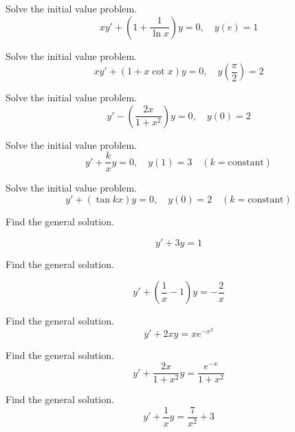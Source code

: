 \documentclass{ximera}
\begin{document}
\begin{problem}\label{exer:2.1.7} Solve
the initial value problem.
$$xy'+\left(1+\frac{1}{\ln x}\right)y=0,\quad y(e)=1$$
\end{problem}

\begin{problem}\label{exer:2.1.8} Solve
the initial value problem.
$$xy'+(1+ x\cot x)y=0,\quad y\left(\frac{\pi}{2}
\right)=2$$
\end{problem}

\begin{problem}\label{exer:2.1.9} Solve
the initial value problem.
$$y'-\left(\frac{2x}{1+x^2}\right)y=0,\quad y(0)=2$$
\end{problem}

\begin{problem}\label{exer:2.1.10} Solve
the initial value problem.
$$y'+\frac{k}{x}y=0,\quad y(1)=3 \quad (k=
\mbox{constant})$$
\end{problem}

\begin{problem}\label{exer:2.1.11} Solve
the initial value problem.
$$y'+(\tan kx)y=0,\quad y(0)=2 \quad (k= \mbox{constant})$$
\end{problem}


\begin{problem}\label{exer:2.1.12} Find
the general solution. 

$$y'+3y=1$$


\end{problem}

\begin{problem}\label{exer:2.1.13} Find
the general solution. 

$$y'+\left(\frac{1}{x}-1\right)y=-\frac{2}{x}$$

\end{problem}

\begin{problem}\label{exer:2.1.14} Find
the general solution. 
$$y'+2xy=xe^{-x^2}$$

\end{problem}

\begin{problem}\label{exer:2.1.15} Find
the general solution. 
$$y'+\frac{2x}{1+x^2}y=\frac{e^{-x}}{1+x^2}$$


\end{problem}

\begin{problem}\label{exer:2.1.16} Find the general solution.
$$y'+\frac{1}{x}y=\frac{7}{x^2}+3$$
\end{problem}
\end{document}
